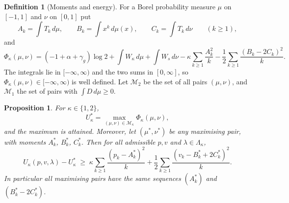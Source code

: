 \documentclass[11pt]{article}
\newtheorem{proposition}[theorem]{Proposition}
\theoremstyle{definition}
\newtheorem{definition}[theorem]{Definition}
\begin{document}
\begin{definition}[Moments and energy]\label{def:energy}
For a Borel probability measure $\mu$ on $[-1,1]$ and $\nu$ on $[0,1]$ put
\[
A_k=\int T_k\,d\mu,\qquad B_k=\int x^k\,d\mu(x),\qquad C_k=\int T_k\,d\nu\qquad(k\ge1),
\]
and
\[
\Phi_\kappa(\mu,\nu)=(-1+\alpha+\gamma_g)\log2+\int W_\kappa\,d\mu+\int W_s\,d\nu-\kappa\sum_{k\ge1}\frac{A_k^2}{k}-\frac12\sum_{k\ge1}\frac{(B_k-2C_k)^2}{k}.
\]
The integrals lie in $[-\infty,\infty)$ and the two sums in $[0,\infty]$, so $\Phi_\kappa(\mu,\nu)\in[-\infty,\infty)$ is well defined. Let $\mathcal M_2$ be the set of all pairs $(\mu,\nu)$, and $\mathcal M_1$ the set of pairs with $\int D\,d\mu\ge0$.
\end{definition}



\begin{proposition}\label{prop:dual}
For $\kappa\in\{1,2\}$,
\[
U^*_\kappa=\max_{(\mu,\nu)\in\mathcal M_\kappa}\Phi_\kappa(\mu,\nu),
\]
and the maximum is attained. Moreover, let $(\mu^*,\nu^*)$ be any maximising pair, with moments $A^*_k$, $B^*_k$, $C^*_k$. Then for all admissible $p,v$ and $\lambda\in\Lambda_\kappa$,
\begin{equation}\label{eq:excess}
U_\kappa(p,v,\lambda)-U^*_\kappa\;\ge\;\kappa\sum_{k\ge1}\frac{(p_k-A^*_k)^2}{k}+\frac12\sum_{k\ge1}\frac{(v_k-B^*_k+2C^*_k)^2}{k}.
\end{equation}
In particular all maximising pairs have the same sequences $(A^*_k)$ and $(B^*_k-2C^*_k)$.
\end{proposition}
\end{document}
